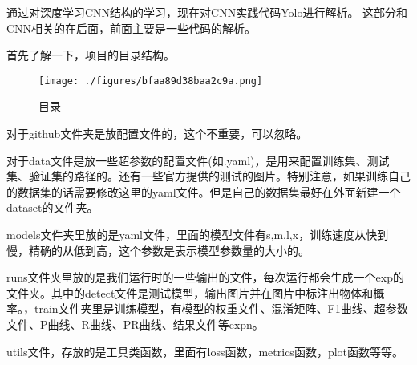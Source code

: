 

通过对深度学习CNN结构的学习，现在对CNN实践代码Yolo进行解析。
这部分和CNN相关的在后面，前面主要是一些代码的解析。

首先了解一下，项目的目录结构。\begin{figure}[ht]
\centering
\texttt{[image: ./figures/bfaa89d38baa2c9a.png]}
\caption{目录} \label{fig_yolov5_1}
\end{figure}
对于github文件夹是放配置文件的，这个不重要，可以忽略。

对于data文件是放一些超参数的配置文件(如.yaml)，是用来配置训练集、测试集、验证集的路径的。还有一些官方提供的测试的图片。特别注意，如果训练自己的数据集的话需要修改这里的yaml文件。但是自己的数据集最好在外面新建一个dataset的文件夹。

models文件夹里放的是yaml文件，里面的模型文件有s,m,l,x，训练速度从快到慢，精确的从低到高，这个参数是表示模型参数量的大小的。

runs文件夹里放的是我们运行时的一些输出的文件，每次运行都会生成一个exp的文件夹。其中的detect文件是测试模型，输出图片并在图片中标注出物体和概率。，train文件夹里是训练模型，有模型的权重文件、混淆矩阵、F1曲线、超参数文件、P曲线、R曲线、PR曲线、结果文件等expn。

utils文件，存放的是工具类函数，里面有loss函数，metrics函数，plot函数等等。
